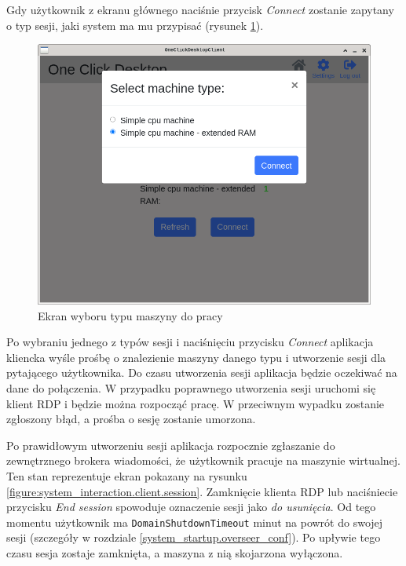 \documentclass[../opis-rozwiazania.tex]{subfiles}
\begin{document}
Gdy użytkownik z ekranu głównego naciśnie przycisk \textit{Connect} zostanie zapytany o typ sesji, jaki system ma mu przypisać (rysunek \ref{figure:system_interaction.client.select}).

\begin{figure}[ht!]
  \centering
  \includegraphics[width=\textwidth]{resources/client_select.png}
  \caption{Ekran wyboru typu maszyny do pracy}
  \label{figure:system_interaction.client.select}
\end{figure}

Po wybraniu jednego z typów sesji i naciśnięciu przycisku \textit{Connect} aplikacja kliencka wyśle prośbę o znalezienie maszyny danego typu i utworzenie sesji dla pytającego użytkownika.
Do czasu utworzenia sesji aplikacja będzie oczekiwać na dane do połączenia.
W przypadku poprawnego utworzenia sesji uruchomi się klient RDP i będzie można rozpocząć pracę.
W przeciwnym wypadku zostanie zgłoszony błąd, a prośba o sesję zostanie umorzona.

Po prawidłowym utworzeniu sesji aplikacja rozpocznie zgłaszanie do zewnętrznego brokera wiadomości, że użytkownik pracuje na maszynie wirtualnej.
Ten stan reprezentuje ekran pokazany na rysunku \ref{figure:system_interaction.client.session}.
Zamknięcie klienta RDP lub naciśniecie przycisku \textit{End session} spowoduje oznaczenie sesji jako \textit{do usunięcia}.
Od tego momentu użytkownik ma \texttt{DomainShutdownTimeout} minut na powrót do swojej sesji (szczegóły w rozdziale \ref{system_startup.overseer_conf}).
Po upływie tego czasu sesja zostaje zamknięta, a maszyna z nią skojarzona wyłączona.
\end{document}
